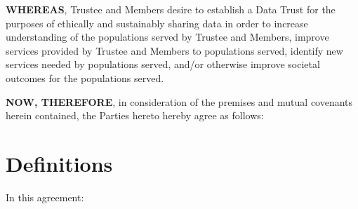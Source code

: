 \documentclass[]{book}
\begin{document}
\textbf{WHEREAS}, Trustee and Members desire to establish a Data Trust for the purposes of ethically and sustainably sharing data in order to increase understanding of the populations served by Trustee and Members, improve services provided by Trustee and Members to populations served, identify new services needed by populations served, and/or otherwise improve societal outcomes for the populations served.

\textbf{NOW, THEREFORE}, in consideration of the premises and mutual covenants herein contained, the Parties hereto hereby agree as follows:

\hypertarget{definitions}{%
\chapter{Definitions}\label{definitions}}

In this agreement:
\end{document}
